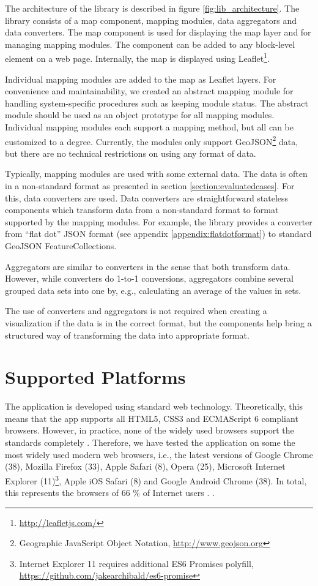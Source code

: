 The architecture of the library is described in figure \ref{fig:lib_architecture}. The library consists of a map component, mapping modules, data aggregators and data converters. The map component is used for displaying the map layer and for managing mapping modules. The component can be added to any block-level element on a web page. Internally, the map is displayed using Leaflet\footnote{\url{http://leafletjs.com/}}. 

Individual mapping modules are added to the map as Leaflet layers. For convenience and maintainability, we created an abstract mapping module for handling system-specific procedures such as keeping module status. The abstract module should be used as an object prototype for all mapping modules. Individual mapping modules each support a mapping method, but all can be customized to a degree. Currently, the modules only support GeoJSON\footnote{Geographic JavaScript Object Notation, \url{http://www.geojson.org}} data, but there are no technical restrictions on using any format of data.

Typically, mapping modules are used with some external data. The data is often in a non-standard format as presented in section \ref{section:evaluatedcases}. For this, data converters are used. Data converters are straightforward stateless components which transform data from a non-standard format to format supported by the mapping modules. For example, the library provides a converter from ``flat dot'' JSON format (see appendix \ref{appendix:flatdotformat}) to standard GeoJSON FeatureCollections.

Aggregators are similar to converters in the sense that both transform data. However, while converters do 1-to-1 conversions, aggregators combine several grouped data sets into one by, e.g., calculating an average of the values in sets.
	
The use of converters and aggregators is not required when creating a visualization if the data is in the correct format, but the components help bring a structured way of transforming the data into appropriate format.

\section{Supported Platforms}

The application is developed using standard web technology. Theoretically, this means that the app supports all HTML5, CSS3 and ECMAScript 6 compliant browsers. However, in practice, none of the widely used browsers support the standards completely \citep{manian_html5_2011}. Therefore, we have tested the application on some the most widely used modern web browsers, i.e., the latest versions of Google Chrome (38), Mozilla Firefox (33), Apple Safari (8), Opera (25), Microsoft Internet Explorer (11)\footnote{Internet Explorer 11 requires additional ES6 Promises polyfill, \url{https://github.com/jakearchibald/es6-promise}}, Apple iOS Safari (8) and Google Android Chrome (38). In total, this represents the browsers of 66 \% of Internet users \citep{statcounter_globalstats_2014}. .

